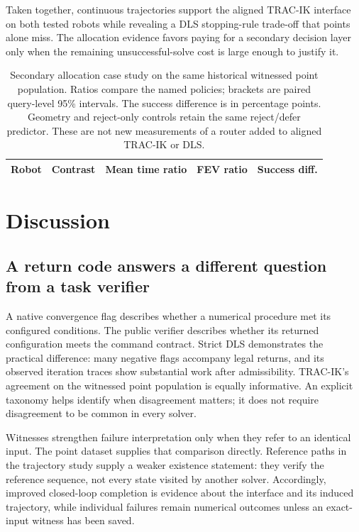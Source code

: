\documentclass[10pt,a4paper]{article}
\begin{document}
Taken together, continuous trajectories support the aligned TRAC-IK interface on
both tested robots while revealing a DLS stopping-rule trade-off that points alone
miss. The allocation evidence favors paying for a secondary decision layer only
when the remaining unsuccessful-solve cost is large enough to justify it.

\begin{table}[tb]
\centering\small
\caption{Secondary allocation case study on the same historical witnessed point
population. Ratios compare the named policies; brackets are paired query-level
95\% intervals. The success difference is in percentage points.
Geometry and reject-only controls retain the same reject/defer predictor.
These are not new measurements of a router added to aligned TRAC-IK or DLS.}
\label{tab:allocation}
\begin{tabular}{llrrr}\toprule
Robot & Contrast & Mean time ratio & FEV ratio & Success diff.\\\midrule

\end{tabular}
\end{table}

\section{Discussion}
\label{sec:discussion}

\subsection{A return code answers a different question from a task verifier}

A native convergence flag describes whether a numerical procedure met its
configured conditions. The public verifier describes whether its returned
configuration meets the command contract. Strict DLS demonstrates the practical
difference: many negative flags accompany legal returns, and its observed
iteration traces show substantial work after admissibility.
TRAC-IK's agreement on the witnessed point population is equally informative.
An explicit taxonomy helps identify when disagreement matters; it does not
require disagreement to be common in every solver.

Witnesses strengthen failure interpretation only when they refer to an identical
input. The point dataset supplies that comparison directly.
Reference paths in the trajectory study supply a weaker existence statement:
they verify the reference sequence, not every state visited by another solver.
Accordingly, improved closed-loop completion is evidence about the interface
and its induced trajectory, while individual failures remain numerical outcomes
unless an exact-input witness has been saved.
\end{document}

